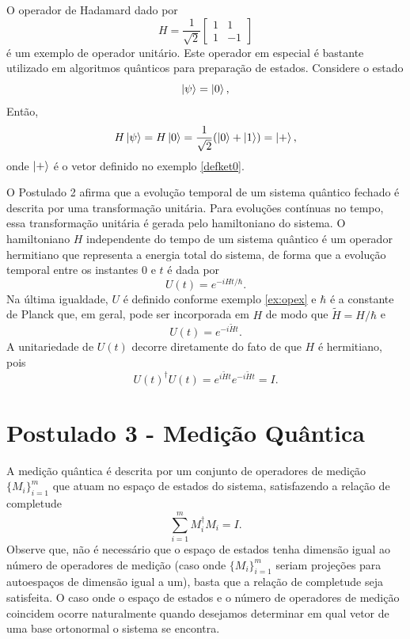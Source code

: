\begin{example}\label{ex:h}
    O operador de Hadamard dado por
\begin{equation}
    H = \frac{1}{\sqrt{2}}\begin{bmatrix}
            1 & 1 \\
            1 & -1
        \end{bmatrix}
\end{equation}
é um exemplo de operador unitário. Este operador em especial é bastante utilizado em algoritmos quânticos para preparação de estados. Considere o estado
$$
\ket{\psi} = \ket{0},
$$
Então,
$$
H\ket{\psi} = H\ket{0} = \frac{1}{\sqrt{2}}(\ket{0} + \ket{1}) = \ket{+},
$$
onde $\ket{+}$ é o vetor definido no exemplo \ref{defket0}.
\end{example}

O Postulado 2 afirma que a evolução temporal de um sistema quântico fechado é descrita por uma transformação unitária. Para evoluções contínuas no tempo, essa transformação unitária é gerada pelo hamiltoniano do sistema. O hamiltoniano $H$ independente do tempo de um sistema quântico é um operador hermitiano que representa a energia total do sistema, de forma que a evolução temporal entre os instantes $0$ e $t$ é dada por
\begin{equation}
U(t) = e^{-iHt/\hbar}.
\end{equation}
Na última igualdade, $U$ é definido conforme exemplo \ref{ex:opex} e $\hbar$ é a constante de Planck que, em geral, pode ser incorporada em $H$ de modo que $\tilde{H}=H/\hbar$ e
\begin{equation}
U(t) = e^{-i\tilde{H}t}.
\end{equation}
A unitariedade de $U(t)$ decorre diretamente do fato de que $H$ é hermitiano, pois
\begin{equation}
U(t)^\dagger U(t)
=
e^{i\tilde{H}t} e^{-i\tilde{H}t}
= I.
\end{equation}

\section{Postulado 3 - Medição Quântica}\label{sec:p3}

A medição quântica é descrita por um conjunto de operadores de medição $\{M_i\}_{i=1}^m$ que atuam no espaço de estados do sistema, satisfazendo a relação de
completude
\begin{equation}
\sum_{i=1}^m M_i^\dagger M_i = I.
\end{equation}
Observe que, não é necessário que o espaço de estados tenha dimensão igual ao número de operadores de medição (caso onde $\{M_i\}_{i=1}^m$ seriam projeções para autoespaços de dimensão igual a um), basta que a relação de completude seja satisfeita. O caso onde o espaço de estados e o número de operadores de medição coincidem ocorre naturalmente quando desejamos determinar em qual vetor de uma base ortonormal o sistema se encontra.

